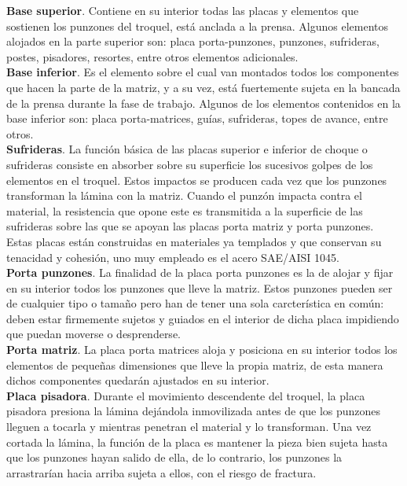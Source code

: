 \textbf{Base superior}. Contiene en su interior todas las placas y elementos que sostienen 
los punzones del troquel, está anclada a la prensa. Algunos elementos alojados en 
la parte superior son: placa porta-punzones, punzones, sufrideras, postes, pisadores, resortes, 
entre otros elementos adicionales.\\

\textbf{Base inferior}. Es el elemento sobre el cual van montados todos los componentes 
que hacen la parte de la matriz, y a su vez, está fuertemente sujeta en la bancada 
de la prensa durante la fase de trabajo. Algunos de los elementos contenidos en 
la base inferior son: placa  porta-matrices, guías, sufrideras, topes de avance, entre 
otros.\\

\textbf{Sufrideras}. La función básica de las placas superior e inferior de choque o sufrideras 
consiste en absorber sobre su superficie los sucesivos golpes de los elementos en el troquel. 
Estos impactos se producen cada vez que los punzones transforman la lámina con la matriz. Cuando 
el punzón impacta contra el material, la resistencia que opone este es transmitida a la 
superficie de las sufrideras sobre las que se apoyan las placas porta matriz y porta punzones. 
Estas placas están construidas en materiales ya templados y que conservan su tenacidad y cohesión, 
uno muy empleado es el acero SAE/AISI 1045.\\

\textbf{Porta punzones}. La finalidad de la placa porta punzones es la de alojar y fijar en 
su interior todos los punzones que lleve la matriz. Estos punzones pueden ser de cualquier 
tipo o tamaño pero han de tener una sola carcterística en común: deben estar firmemente 
sujetos y guiados en el interior de dicha placa impidiendo que puedan moverse o desprenderse.\\

\textbf{Porta matriz}. La placa porta matrices aloja y posiciona en su interior todos 
los elementos de pequeñas dimensiones que lleve la propia matriz, de esta manera dichos componentes 
quedarán ajustados en su interior.\\

\textbf{Placa pisadora}. Durante el movimiento descendente del troquel, la placa pisadora presiona 
la lámina dejándola inmovilizada antes de que los punzones lleguen a tocarla y mientras penetran 
el material y lo transforman. Una vez cortada la lámina, la función de la placa es mantener la 
pieza bien sujeta hasta que los punzones hayan salido de ella, de lo contrario, los punzones 
la arrastrarían hacia arriba sujeta a ellos, con el riesgo de fractura.\\

